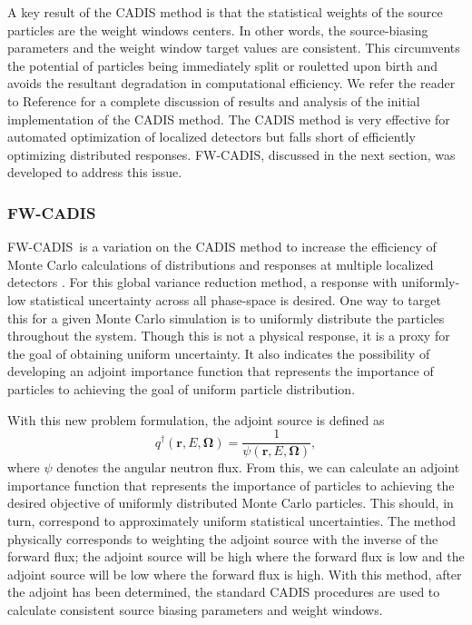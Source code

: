 \documentclass{article} %
\newcommand{\bo}{\mathbf\Omega}
\newcommand{\vecr}{\textbf{r}}
\newcommand{\fwc}{\mbox{FW-CADIS}}
\begin{document}
A key result of the CADIS method is that the statistical weights of
the source particles are the weight windows centers. In other
words, the source-biasing parameters and the weight window target values are
consistent. This circumvents the potential of particles being immediately split
or rouletted upon birth and avoids the resultant degradation in computational
efficiency. We refer the reader to Reference \cite{cadis} for a complete
discussion of results and analysis of the initial implementation of the CADIS
method. The CADIS method is very effective for automated optimization of
localized detectors but falls short of efficiently optimizing distributed
responses. \fwc, discussed in the next section, was developed to address this
issue.

\subsubsection{\fwc}

\fwc\ is a variation on the CADIS method to increase the efficiency of Monte
Carlo calculations of distributions and responses at multiple localized
detectors \cite{fwcadis}. For this global variance reduction method, a
response with uniformly-low statistical uncertainty across all phase-space is
desired. One way to target this for a given Monte Carlo simulation is to
uniformly distribute the particles throughout the system. Though this is not a
physical response, it is a proxy for the goal of obtaining uniform
uncertainty. It also indicates the possibility of developing an adjoint
importance function that represents the importance of particles to achieving
the goal of uniform particle distribution.

With this new problem formulation, the adjoint source is defined as
%
\begin{equation}
q^{\dagger}(\vecr,E,\bo) = \frac{1}{\psi(\vecr,E,\bo)},
\end{equation}
%
where $\psi$ denotes the angular neutron flux. From this,
we can calculate an adjoint importance function that represents the
importance of particles to achieving the desired objective of uniformly
distributed Monte Carlo particles. This should, in turn, correspond to
approximately uniform statistical uncertainties. The method physically 
corresponds to weighting the adjoint source with the inverse of the forward
flux; the adjoint source will be high where the forward flux is low and the
adjoint source will be low where the forward flux is high. With this method,
after the adjoint has been determined, the standard CADIS procedures are used
to calculate consistent source biasing parameters and weight windows.
\end{document}
